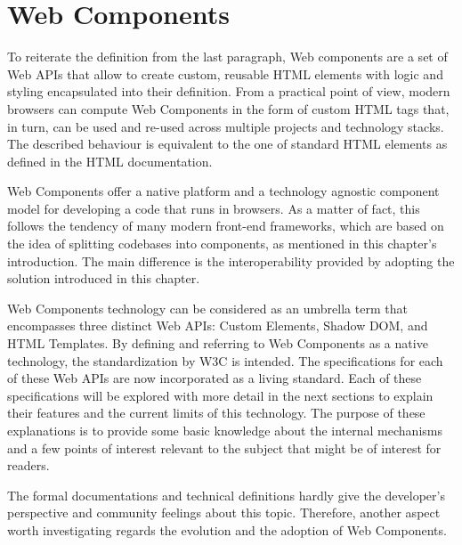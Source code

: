 \section{Web Components}
\label{sec:webComponents}

To reiterate the definition from the last paragraph, Web components are a set of Web APIs that allow to create custom, reusable HTML elements with logic and styling encapsulated into their definition. From a practical point of view, modern browsers can compute Web Components in the form of custom HTML tags that, in turn, can be used and re-used across multiple projects and technology stacks. The described behaviour is equivalent to the one of standard HTML elements as defined in the HTML documentation.

Web Components offer a native platform and a technology agnostic component model for developing a code that runs in browsers. As a matter of fact, this follows the tendency of many modern front-end frameworks, which are based on the idea of splitting codebases into components, as mentioned in this chapter’s introduction. The main difference is the interoperability provided by adopting the solution introduced in this chapter.

Web Components technology can be considered as an umbrella term that encompasses three distinct Web APIs: Custom Elements, Shadow DOM, and HTML Templates. By defining and referring to Web Components as a native technology, the standardization by W3C is intended. The specifications for each of these Web APIs are now incorporated as a living standard. Each of these specifications will be explored with more detail in the next sections to explain their features and the current limits of this technology. The purpose of these explanations is to provide some basic knowledge about the internal mechanisms and a few points of interest relevant to the subject that might be of interest for readers.

The formal documentations and technical definitions hardly give the developer’s perspective and community feelings about this topic. Therefore, another aspect worth investigating regards the evolution and the adoption of Web Components.


